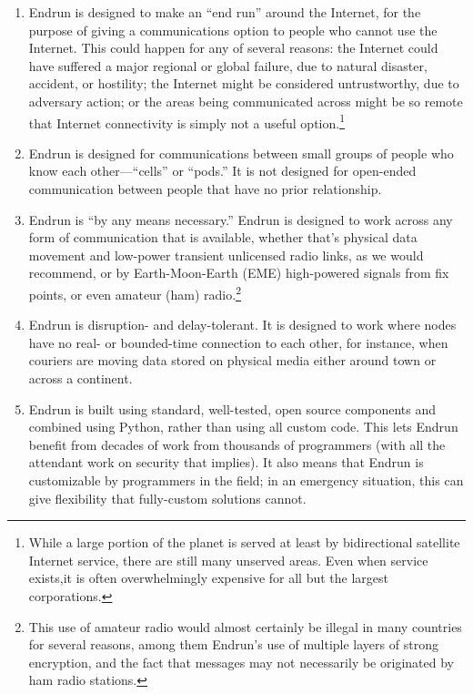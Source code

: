\documentclass[12pt]{article}
\begin{document}
  \begin{enumerate}
    \item Endrun is designed to make an ``end run'' around the Internet, for the purpose of giving a communications option to people who cannot use the Internet. This could happen for any of several reasons: the Internet could have suffered a major regional or global failure, due to natural disaster, accident, or hostility; the Internet might be considered untrustworthy, due to adversary action; or the areas being communicated across might be so remote that Internet connectivity is simply not a useful option.\footnote{While a large portion of the planet is served at least by bidirectional satellite Internet service, there are still many unserved areas. Even when service exists,it is often overwhelmingly expensive for all but the largest corporations.}
    
    \item Endrun is designed for communications between small groups of people who know each other---``cells'' or ``pods.'' It is not designed for open-ended communication between people that have no prior relationship.
    
    \item Endrun is ``by any means necessary.'' Endrun is designed to work across any form of communication that is available, whether that's physical data movement and low-power transient unlicensed radio links, as we would recommend, or by Earth-Moon-Earth (EME) high-powered signals from fix points, or even amateur (ham) radio.\footnote{This use of amateur radio would almost certainly be illegal in many countries for several reasons, among them Endrun's use of multiple layers of strong encryption, and the fact that messages may not necessarily be originated by ham radio stations.}
    
    \item Endrun is disruption- and delay-tolerant. It is designed to work where nodes have no real- or bounded-time connection to each other, for instance, when couriers are moving data stored on physical media either around town or across a continent.
    
    \item Endrun is built using standard, well-tested, open source components and combined using Python, rather than using all custom code. This lets Endrun benefit from decades of work from thousands of programmers (with all the attendant work on security that implies). It also means that Endrun is customizable by programmers in the field; in an emergency situation, this can give flexibility that fully-custom solutions cannot.
    
  \end{enumerate}
  
\end{document}
